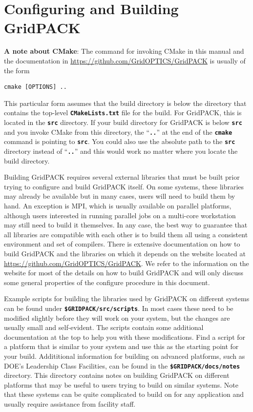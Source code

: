 \chapter{Configuring and Building GridPACK}

\textbf{A note about CMake}: The command for invoking CMake in this manual and
the documentation in \href{https://github.com/GridOPTICS/GridPACK}{https://github.com/GridOPTICS/GridPACK} is usually of the form

{
\color{red}
\begin{Verbatim}[fontseries=b]
       cmake [OPTIONS] ..
\end{Verbatim}
}

This particular form assumes that the build directory is below the directory that contains the top-level \texttt{\textbf{CMakeLists.txt}} file for the build. For GridPACK, this is located in the \texttt{\textbf{src}} directory. If your build directory for GridPACK is below \texttt{\textbf{src}} and you invoke CMake from this directory, the ``\texttt{\textbf{..}}'' at the end of the \texttt{\textbf{cmake}} command is pointing to \texttt{\textbf{src}}. You could also use the absolute path to the \texttt{\textbf{src}} directory instead of ``\texttt{\textbf{..}}'' and this would work no matter where you locate the build directory.

Building GridPACK requires several external libraries that must be built prior trying to configure and build GridPACK itself. On some systems, these libraries may already be available but in many cases, users will need to build them by hand. An exception is MPI, which is usually available on parallel platforms, although users interested in running parallel jobs on a multi-core workstation may still need to build it themselves. In any case, the best way to guarantee that all libraries are compatible with each other is to build them all using a consistent environment and set of compilers. There is extensive documentation on how to build GridPACK and the libraries on which it depends on the website located at \href{https://github.com/GridOPTICS/GridPACK}{https://github.com/GridOPTICS/GridPACK}. We refer to the information on the website for most of the details on how to build GridPACK and will only discuss some general properties of the configure procedure in this document.

Example scripts for building the libraries used by GridPACK on different systems can be found under \texttt{\textbf{\$GRIDPACK/src/scripts}}. In most cases these need to be modified slightly before they will work on your system, but the changes are usually small and self-evident. The scripts contain some additional documentation at the top to help you with these modifications. Find a script for a platform that is similar to your system and use this as the starting point for your build. Addititional information for building on advanced platforms, such as DOE's Leadership Class Facilities, can be found in the \texttt{\textbf{\$GRIDPACK/docs/notes}} directory. This directory contains notes on building GridPACK on different platforms that may be useful to users trying to build on similar systems. Note that these systems can be quite complicated to build on for any application and usually require assistance from facility staff.

